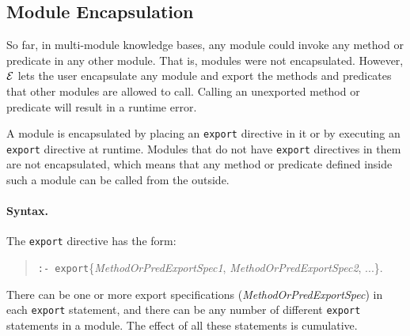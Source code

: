 \documentclass[11pt]{article}
\newcommand{\ERGO}{\mbox{\ensuremath{\cal{E}}\smaller{{\sc{RGO}}}}\xspace}
\newcommand{\FLSYSTEM}{\ERGO}
\begin{document}
\subsection{Module Encapsulation}\label{sec-module-encap}

So far, in multi-module knowledge bases, any module could invoke any method or
predicate in any other module. That is, modules were not encapsulated.
However, \FLSYSTEM lets the user encapsulate any module and export the
methods and predicates that other modules are allowed to call. Calling
an unexported method or predicate will result in a runtime error.

A module is encapsulated by placing an {\tt export} directive in it or by
executing an {\tt export} directive at runtime.  Modules that do not have
{\tt export} directives in them are not encapsulated, which means that any
method or predicate defined inside such a module can be called from the outside.

\paragraph{Syntax.}
The {\tt export} directive has the form:
\begin{quote}
  {\tt :- export}\{\emph{MethodOrPredExportSpec1},
  \emph{MethodOrPredExportSpec2}, ...\}.
\end{quote}
There can be one or more export specifications
(\emph{MethodOrPredExportSpec}) in each {\tt export} statement, and there
can be any number of different {\tt export} statements in a module. The
effect of all 
these statements is cumulative.   
\end{document}
